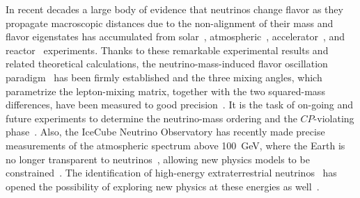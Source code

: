 \documentclass[3p,12pt]{elsarticle}
\begin{document}
In recent decades a large body of evidence that neutrinos change
flavor as they propagate macroscopic distances due to the
non-alignment of their mass and flavor eigenstates has accumulated from
solar~\citep{Abe:2010hy, Borexino2014},
atmospheric~\citep{PhysRevD.91.072004,Richard:2015aua,IceCube:2019dqi,ANTARES:2018rtf},
accelerator~\citep{PhysRevLett.112.181801,
  PhysRevD.93.051104,PhysRevLett.116.151806, PhysRevLett.110.251801}, and
reactor~\citep{An:2013zwz,Abe:2015rcp, Kim:2016yvm} experiments.
Thanks to these remarkable
experimental results and related theoretical calculations, the
  neutrino-mass-induced flavor oscillation paradigm~\citep{Pontecorvo:1967fh,Gribov:1968kq,fukugita2003physics,
  Akhmedov:1999uz,Balantekin:2013kc, GonzalezGarcia:2007ib,Mohapatra:qv, Gouvea:2013fj}
has been firmly established and the three mixing angles, which
parametrize the lepton-mixing matrix, together with the two
squared-mass differences, have been measured to good
precision~\citep{Esteban:2020cvm,deSalas:2017kay,Capozzi:2018ubv,deSalas:2020pgw}. It
is the task of on-going 
and future experiments to determine the neutrino-mass ordering 
and the $CP$-violating phase~\citep{Hewett:2012et,
  Acciarri:2016crz,Aartsen:2014oha, Kouchner:2016pqa,DeRosa:2016ifc}. 
Also, the IceCube Neutrino Observatory has recently made precise measurements of the atmospheric
spectrum above 100~GeV, where the Earth is no longer transparent to
neutrinos~\citep{Donini:2018tsg,Bustamante:2017xuy,IceCube:2020rnc}, allowing new physics
models to be constrained~\citep{Aartsen:2014gkd,TheIceCube:2016oqi}.
The identification of high-energy
extraterrestrial neutrinos~\citep{Aartsen:2014gkd,Aartsen:2015rwa,IceCube:2020wum}
has opened the possibility of exploring new physics at these energies as well~\citep{Arguelles:2015dca, Bustamante:2015waa, Baerwald:2012kc,Arguelles:2019rbn, Esteban:2021tub}. 
\end{document}
